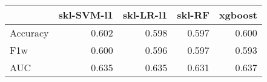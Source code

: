 \begin{tabular}{lrrrr}
\toprule
{} &  skl-SVM-l1 &  skl-LR-l1 &  skl-RF &  xgboost \\
\midrule
Accuracy &       0.602 &      0.598 &   0.597 &    0.600 \\
F1w      &       0.600 &      0.596 &   0.597 &    0.593 \\
AUC      &       0.635 &      0.635 &   0.631 &    0.637 \\
\bottomrule
\end{tabular}
